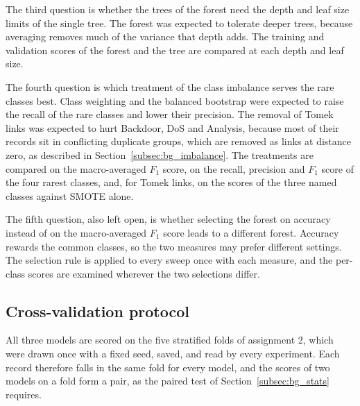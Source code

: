 \documentclass[conference,10pt]{IEEEtran}
\begin{document}
The third question is whether the trees of the forest need the depth and
leaf size limits of the single tree. The forest was expected to tolerate
deeper trees, because averaging removes much of the variance that depth adds. The training
and validation scores of the forest and the tree are compared at each depth
and leaf size.

The fourth question is which treatment of the class imbalance serves the
rare classes best. Class weighting and the balanced bootstrap were expected
to raise the recall of the rare classes and lower their precision. The
removal of Tomek links was expected to hurt Backdoor, DoS and Analysis,
because most of their records sit in conflicting duplicate groups, which are removed as links at distance zero, as described in Section~\ref{subsec:bg_imbalance}. The treatments are compared on the
macro-averaged $F_1$ score, on the recall, precision and $F_1$ score of the
four rarest classes, and, for Tomek links, on the scores of the three named
classes against SMOTE alone.

The fifth question, also left open, is whether selecting the forest on
accuracy instead of on the macro-averaged $F_1$ score leads to a different
forest. Accuracy rewards the common classes, so the two measures may prefer
different settings. The selection rule is applied to every sweep once with
each measure, and the per-class scores are examined wherever the two
selections differ.

\subsection{Cross-validation protocol}
\label{subsec:emp_cv}

All three models are scored on the five stratified folds of assignment 2,
which were drawn once with a fixed seed, saved, and read by every
experiment. Each record therefore falls in the same fold for every model,
and the scores of two models on a fold form a pair, as the paired test of Section~\ref{subsec:bg_stats} requires.
\end{document}
